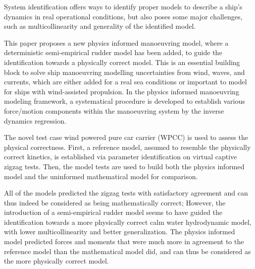 System identification offers ways to identify proper models to describe a ship's dynamics in real operational conditions, but also poses some major challenges, such as multicollinearity and generality of the identified model. 

This paper proposes a new physics informed manoeuvring model, where a deterministic semi-empirical rudder model has been added, to guide the identification towards a physically correct model.  
This is an essential building block to solve ship manoeuvring modelling uncertainties from wind, waves, and currents, which are either added for a real sea conditions or important to model for ships with wind-assisted propulsion.
In the physics informed manoeuvring modeling framework, a systematical procedure is developed to establish various force/motion components within the manoeuvring system by the inverse dynamics regression. 

The novel test case wind powered pure car carrier (WPCC) is used to assess the physical correctness. First, a reference model, assumed to resemble the physically correct kinetics, is established via parameter identification on virtual captive zigzag tests. Then, the model tests are used to build both the physics informed model and the uninformed mathematical model for comparison.

All of the models predicted the zigzag tests with satisfactory agreement and can thus indeed be considered as being mathematically correct; However, the introduction of a semi-empirical rudder model seems to have guided the identification towards a more physically correct calm water hydrodynamic model, with lower multicollinearity and better generalization. The physics informed model predicted forces and moments that were much more in agreement to the reference model than the mathematical model did, and can thus be considered as the more physically correct model. 

